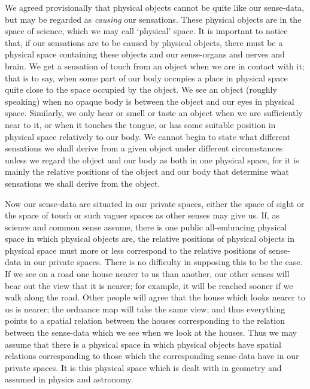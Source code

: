 \documentclass[oneside,letterpaper,12pt]{book}
\begin{document}
We agreed provisionally that physical objects cannot be quite like our
sense-data, but may be regarded as \emph{causing} our sensations. These
physical objects are in the space of science, which we may call
`physical' space. It is important to
notice that, if our sensations are to be caused by physical objects,
there must be a physical space containing these objects and our
sense-organs and nerves and brain. We get a sensation of touch from an
object when we are in contact with it; that is to say, when some part of
our body occupies a place in physical space quite close to the space
occupied by the object. We see an object (roughly speaking) when no
opaque body is between the object and our eyes in physical space.
Similarly, we only hear or smell or taste an object when we are
sufficiently near to it, or when it touches the tongue, or has some
suitable position in physical space relatively to our body. We cannot
begin to state what different sensations we shall derive from a given
object under different circumstances unless we regard the object and our
body as both in one physical space, for it is mainly the relative
positions of the object and our body that determine what sensations we
shall derive from the object.

\label{private} Now our sense-data are situated in our private spaces, either the space
of sight or the space of touch or such vaguer spaces as other senses may
give us. \label{onespace} If, as science and common sense assume, there is one public
all-embracing physical space in which physical objects are, the relative
positions of physical objects in physical space must more or less
correspond to the relative positions of sense-data in our private
spaces. There is no difficulty in supposing this to be the case. \label{distance} If we
see on a road one house nearer to us than another, our other senses will
bear out the view that it is nearer; for example, it will be reached
sooner if we walk along the road. Other people will agree that the house
which looks nearer to us is nearer; the ordnance map will take the same
view; and thus everything points to a spatial relation between the
houses corresponding to the relation between the sense-data which we see
when we look at the houses. Thus we may assume that there is a physical
space in which physical objects have spatial relations corresponding to
those which the corresponding sense-data have in our private spaces. It
is this physical space which is dealt with in geometry and assumed in
physics and astronomy.
\end{document}
